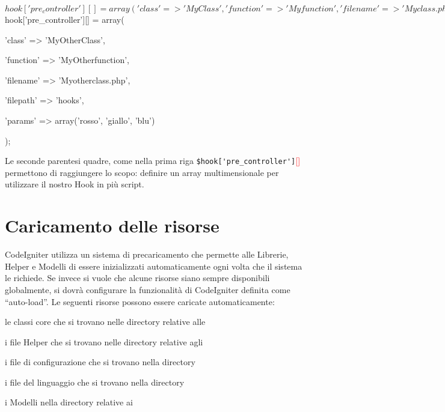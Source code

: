 \begin{code}
$hook['pre_controller'][] = array(

	'class'    => 'MyClass',

	'function' => 'Myfunction',

	'filename' => 'Myclass.php',

	'filepath' => 'hooks',

	'params'   => array('birra', 'vino', 'patatine')

	);

$hook['pre_controller'][] = array(

	'class'    => 'MyOtherClass',

	'function' => 'MyOtherfunction',

	'filename' => 'Myotherclass.php',

	'filepath' => 'hooks',

	'params'   => array('rosso', 'giallo', 'blu')

	);
\end{code}

Le seconde parentesi quadre, come nella prima riga \verb|$hook['pre_controller']|\textcolor{red}{[]} permettono di raggiungere lo scopo: definire un array multimensionale per utilizzare il nostro Hook in più script.

\section*{Caricamento delle risorse}
CodeIgniter utilizza un sistema di precaricamento che permette alle Librerie, Helper e Modelli di essere inizializzati automaticamente ogni volta che il sistema le richiede. Se invece si vuole che alcune risorse siano sempre disponibili globalmente, si dovrà configurare la funzionalità di CodeIgniter definita come ``auto-load''. Le seguenti risorse possono essere caricate automaticamente:

\begin{code}
\item le classi core che si trovano nelle directory relative alle 
\item i file Helper che si trovano nelle directory relative agli 
\item i file di configurazione che si trovano nella directory 
\item i file del linguaggio che si trovano nella directory 
\item i Modelli nella  directory relative ai 
\end{code}


